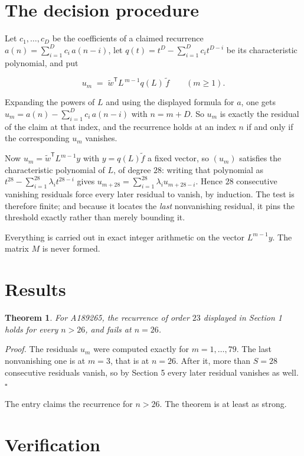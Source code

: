 \documentclass[11pt]{article}
\newtheorem{theorem}{Theorem}
\theoremstyle{definition}
\begin{document}
\section{The decision procedure}

Let $c_1,\dots,c_D$ be the coefficients of a claimed recurrence $a(n) = \sum_{i=1}^{D} c_i\,a(n-i)$, let $q(t) = t^{D} - \sum_{i=1}^{D} c_i t^{D-i}$ be its characteristic polynomial, and put

\[u_m \;=\; \tilde w^{\mathsf T} L^{\,m-1} q(L)\,\tilde f \qquad (m \ge 1).\]

Expanding the powers of $L$ and using the displayed formula for $a$, one gets $u_m = a(n) - \sum_{i=1}^{D} c_i\,a(n-i)$ with $n = m + D$. So $u_m$ is exactly the residual of the claim at that index, and the recurrence holds at an index $n$ if and only if the corresponding $u_m$ vanishes.

Now $u_m = \tilde w^{\mathsf T} L^{m-1} y$ with $y = q(L)\tilde f$ a fixed vector, so $(u_m)$ satisfies the characteristic polynomial of $L$, of degree $28$: writing that polynomial as $t^{28} - \sum_{i=1}^{28} \lambda_i t^{28-i}$ gives $u_{m+28} = \sum_{i=1}^{28} \lambda_i u_{m+28-i}$. Hence $28$ consecutive vanishing residuals force every later residual to vanish, by induction. The test is therefore finite; and because it locates the {\itshape last} nonvanishing residual, it pins the threshold exactly rather than merely bounding it.

Everything is carried out in exact integer arithmetic on the vector $L^{m-1}y$. The matrix $M$ is never formed.

\section{Results}

\begin{theorem} For A189265, the recurrence of order $23$ displayed in Section 1 holds for every $n > 26$, and fails at $n = 26$.\end{theorem}

{\itshape Proof.} The residuals $u_m$ were computed exactly for $m = 1,\dots,79$. The last nonvanishing one is at $m = 3$, that is at $n = 26$. After it, more than $S = 28$ consecutive residuals vanish, so by Section 5 every later residual vanishes as well. $\square$

The entry claims the recurrence for $n > 26$. The theorem is at least as strong.

\section{Verification}
\end{document}
